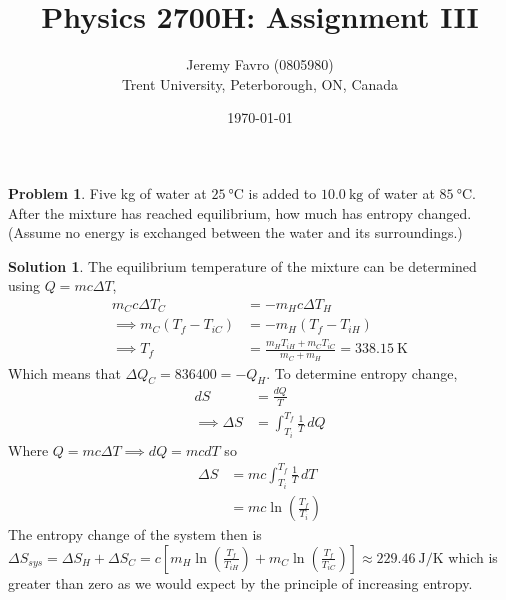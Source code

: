\documentclass[10pt]{article}
\title{Physics 2700H: Assignment III}
\author{Jeremy Favro (0805980) \\ Trent University, Peterborough, ON, Canada}
\date{\today}
\theoremstyle{definition}
\newtheorem{problem}{Problem}
\newtheorem{soln}{Solution}
\begin{document}
\maketitle

\begin{problem}
Five kg of water at $\qty{25}{\degreeCelsius}$ is added to $\qty{10.0}{\kilo\gram}$ of water at $\qty{85}{\degreeCelsius}$.
After the mixture has reached equilibrium, how much has entropy changed. (Assume no energy is exchanged between the water and its surroundings.)
\end{problem}
\begin{soln}
  The equilibrium temperature of the mixture can be determined using $Q=mc\Delta T$,
  \begin{align*}
    m_Cc\Delta T_C                      & =-m_Hc\Delta T_H                                           \\
    \implies m_C\left(T_f-T_{iC}\right) & =-m_H\left(T_f-T_{iH}\right)                               \\
    \implies T_f                        & =\frac{m_HT_{iH}+m_CT_{iC}}{m_C+m_H}=\qty{338.15}{\kelvin}
  \end{align*}
  Which means that $\Delta Q_C=836400=-Q_H$. To determine entropy change,
  \begin{align*}
    dS                & = \frac{dQ}{T}                   \\
    \implies \Delta S & =\int_{T_i}^{T_f}\frac{1}{T}\,dQ
  \end{align*}
  Where $Q=mc\Delta T\implies dQ=mcdT$ so
  \begin{align*}
    \Delta S & =mc\int_{T_i}^{T_f}\frac{1}{T}\,dT \\
             & =mc\ln\left(\frac{T_f}{T_i}\right)
  \end{align*}
  The entropy change of the system then is
  $\Delta S_{sys}=\Delta S_H +\Delta S_C=c\left[m_H\ln\left(\frac{T_f}{T_{iH}}\right)+m_C\ln\left(\frac{T_f}{T_{iC}}\right)\right]\approx \qty{229.46}{\joule\per\kelvin}$
  which is greater than zero as we would expect by the principle of increasing entropy.
\end{soln}
\newpage
\end{document}
